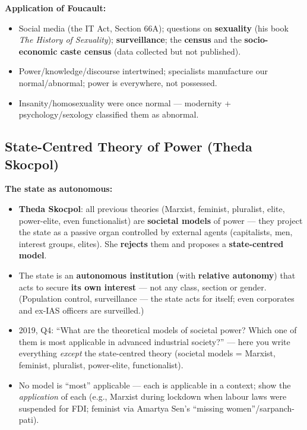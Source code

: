 \begin{ExampleBox}
\textbf{Application of Foucault:}
\begin{itemize}
\item Social media (the IT Act, Section 66A); questions on \textbf{sexuality} (his book \textit{The History of Sexuality}); \textbf{surveillance}; the \textbf{census} and the \textbf{socio-economic caste census} (data collected but not published).
\end{itemize}
\end{ExampleBox}

\begin{QuickRevision}
\begin{itemize}
\item Power/knowledge/discourse intertwined; specialists manufacture our normal/abnormal; power is everywhere, not possessed.
\item Insanity/homosexuality were once normal --- modernity + psychology/sexology classified them as abnormal.
\end{itemize}
\end{QuickRevision}

\sectiondivider

\subsection{State-Centred Theory of Power (Theda Skocpol)}

\begin{KeyConcept}
\textbf{The state as autonomous:}
\begin{itemize}
\item \textbf{Theda Skocpol}: all previous theories (Marxist, feminist, pluralist, elite, power-elite, even functionalist) are \textbf{societal models} of power --- they project the state as a passive organ controlled by external agents (capitalists, men, interest groups, elites). She \textbf{rejects} them and proposes a \textbf{state-centred model}.
\item The state is an \textbf{autonomous institution} (with \textbf{relative autonomy}) that acts to secure \textbf{its own interest} --- not any class, section or gender. (Population control, surveillance --- the state acts for itself; even corporates and ex-IAS officers are surveilled.)
\end{itemize}
\end{KeyConcept}

\begin{PYQLink}
\begin{itemize}
\item 2019, Q4: ``What are the theoretical models of societal power? Which one of them is most applicable in advanced industrial society?'' --- here you write everything \textit{except} the state-centred theory (societal models = Marxist, feminist, pluralist, power-elite, functionalist).
\item No model is ``most'' applicable --- each is applicable in a context; show the \textit{application} of each (e.g., Marxist during lockdown when labour laws were suspended for FDI; feminist via Amartya Sen's ``missing women''/sarpanch-pati).
\end{itemize}
\end{PYQLink}

